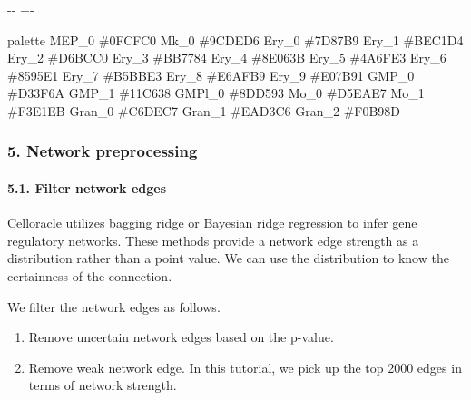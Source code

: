 \documentclass[letterpaper,10pt,english]{sphinxmanual}
\newlength\nbsphinxcodecellspacing
\begin{document}
{

\kern-\sphinxverbatimsmallskipamount\kern-\baselineskip
\kern+\FrameHeightAdjust\kern-\fboxrule
\vspace{\nbsphinxcodecellspacing}

\begin{sphinxVerbatim}[commandchars=\\\{\}]
\llap{\color{nbsphinxout}[25]:\,\hspace{\fboxrule}\hspace{\fboxsep}}        palette
MEP\_0   \#0FCFC0
Mk\_0    \#9CDED6
Ery\_0   \#7D87B9
Ery\_1   \#BEC1D4
Ery\_2   \#D6BCC0
Ery\_3   \#BB7784
Ery\_4   \#8E063B
Ery\_5   \#4A6FE3
Ery\_6   \#8595E1
Ery\_7   \#B5BBE3
Ery\_8   \#E6AFB9
Ery\_9   \#E07B91
GMP\_0   \#D33F6A
GMP\_1   \#11C638
GMPl\_0  \#8DD593
Mo\_0    \#D5EAE7
Mo\_1    \#F3E1EB
Gran\_0  \#C6DEC7
Gran\_1  \#EAD3C6
Gran\_2  \#F0B98D
\end{sphinxVerbatim}
}


\subsubsection{5. Network preprocessing}
\label{\detokenize{notebooks/04_Network_analysis/Network_analysis_with_with_Paul_etal_2015_data:5.-Network-preprocessing}}

\paragraph{5.1. Filter network edges}
\label{\detokenize{notebooks/04_Network_analysis/Network_analysis_with_with_Paul_etal_2015_data:5.1.-Filter-network-edges}}
Celloracle utilizes bagging ridge or Bayesian ridge regression to infer gene regulatory networks. These methods provide a network edge strength as a distribution rather than a point value. We can use the distribution to know the certainness of the connection.

We filter the network edges as follows.
\begin{enumerate}
\def\theenumi{\arabic{enumi}}
\def\labelenumi{(\theenumi )}
\makeatletter\def\p@enumii{\p@enumi (\theenumi )}\makeatother
\item {} 
Remove uncertain network edges based on the p-value.

\item {} 
Remove weak network edge. In this tutorial, we pick up the top 2000 edges in terms of network strength.

\end{enumerate}
\end{document}
